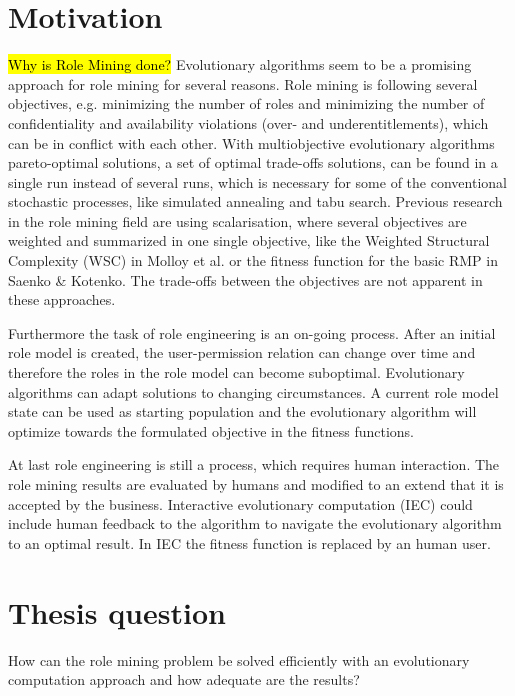 \section{Motivation}
\hl{Why is Role Mining done?}
Evolutionary algorithms seem to be a promising approach for role mining for several reasons. Role mining is following several objectives, e.g. minimizing the number of roles and minimizing the number of confidentiality and availability violations (over- and underentitlements), which can be in conflict with each other. With multiobjective evolutionary algorithms pareto-optimal solutions, a set of optimal trade-offs solutions, can be found in a single run instead of several runs, which is necessary for some of the conventional stochastic processes, like simulated annealing and tabu search\cite{abraham2005evolutionary}. Previous research in the role mining field are using scalarisation, where several objectives are weighted and summarized in one single objective, like the Weighted Structural Complexity (WSC) in Molloy et al.\cite{Molloy} or the fitness function for the basic RMP in Saenko \& Kotenko\cite{saenko2012design}. The trade-offs between the objectives are not apparent in these approaches.

Furthermore the task of role engineering is an on-going process. After an initial role model is created, the user-permission relation can change over time and therefore the roles in the role model can become suboptimal. Evolutionary algorithms can adapt solutions to changing circumstances\cite{Fogel:1997}. A current role model state can be used as starting population and the evolutionary algorithm will optimize towards the formulated objective in the fitness functions.

At last role engineering is still a process, which requires human interaction. The role mining results are evaluated by humans and modified to an extend that it is accepted by the business. Interactive evolutionary computation (IEC)\cite{949485} could include human feedback to the algorithm to navigate the evolutionary algorithm to an optimal result. In IEC the fitness function is replaced by an human user.

\section{Thesis question}
How can the role mining problem be solved efficiently with an evolutionary computation approach and how adequate are the results?

